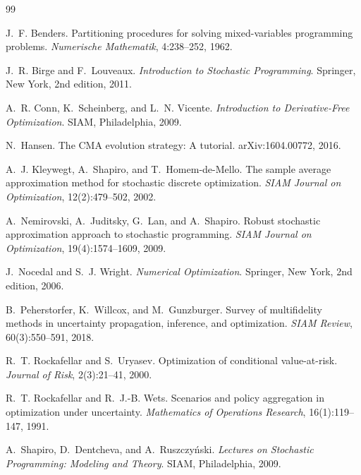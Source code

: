 \documentclass[11pt]{article}
\numberwithin{equation}{section}
\theoremstyle{plain}
\begin{document}

\begin{thebibliography}{99}

J.~F. Benders.
Partitioning procedures for solving mixed-variables programming problems.
\textit{Numerische Mathematik}, 4:238--252, 1962.

J.~R. Birge and F.~Louveaux.
\textit{Introduction to Stochastic Programming}.
Springer, New York, 2nd edition, 2011.

A.~R. Conn, K.~Scheinberg, and L.~N. Vicente.
\textit{Introduction to Derivative-Free Optimization}.
SIAM, Philadelphia, 2009.

N.~Hansen.
The CMA evolution strategy: A tutorial.
arXiv:1604.00772, 2016.

A.~J. Kleywegt, A.~Shapiro, and T.~Homem-de-Mello.
The sample average approximation method for stochastic discrete optimization.
\textit{SIAM Journal on Optimization}, 12(2):479--502, 2002.

A.~Nemirovski, A.~Juditsky, G.~Lan, and A.~Shapiro.
Robust stochastic approximation approach to stochastic programming.
\textit{SIAM Journal on Optimization}, 19(4):1574--1609, 2009.

J.~Nocedal and S.~J. Wright.
\textit{Numerical Optimization}.
Springer, New York, 2nd edition, 2006.

B.~Peherstorfer, K.~Willcox, and M.~Gunzburger.
Survey of multifidelity methods in uncertainty propagation, inference, and
optimization.
\textit{SIAM Review}, 60(3):550--591, 2018.

R.~T. Rockafellar and S.~Uryasev.
Optimization of conditional value-at-risk.
\textit{Journal of Risk}, 2(3):21--41, 2000.

R.~T. Rockafellar and R.~J.-B. Wets.
Scenarios and policy aggregation in optimization under uncertainty.
\textit{Mathematics of Operations Research}, 16(1):119--147, 1991.

A.~Shapiro, D.~Dentcheva, and A.~Ruszczy\'nski.
\textit{Lectures on Stochastic Programming: Modeling and Theory}.
SIAM, Philadelphia, 2009.


\end{thebibliography}
\end{document}
